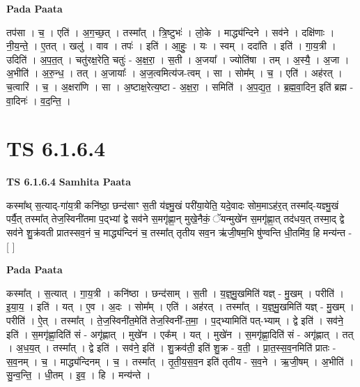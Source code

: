\documentclass[17pt]{extarticle}
\begin{document}
\textbf{Pada Paata} \newline

तप॑सा । च॒ । एति॑ । अ॒ग॒च्छ॒त् । तस्मा᳚त् । त्रि॒ष्टुभः॑ । लो॒के । माद्ध्य॑न्दिने । सव॑ने । दक्षि॑णाः । नी॒य॒न्ते॒ । ए॒तत् । खलु॑ । वाव । तपः॑ । इति॑ । आ॒हुः॒ । यः । स्वम् । ददा॑ति । इति॑ । गा॒य॒त्री । उदिति॑ । अ॒प॒त॒त् । चतु॑रक्ष॒रेति॒ चतुः॑ - अ॒क्ष॒रा॒ । स॒ती । अ॒जया᳚ । ज्योति॑षा । तम् । अ॒स्यै॒ । अ॒जा । अ॒भीति॑ । अ॒रु॒न्ध॒ । तत् । अ॒जायाः᳚ । अ॒ज॒त्वमित्य॑ज-त्वम् । सा । सोम᳚म् । च॒ । एति॑ । अह॑रत् । च॒त्वारि॑ । च॒ । अ॒क्षरा॑णि । सा । अ॒ष्टाक्ष॒रेत्य॒ष्टा - अ॒क्ष॒रा॒ । समिति॑ । अ॒प॒द्य॒त॒ । ब्र॒ह्म॒वा॒दिन॒ इति॑ ब्रह्म - वा॒दिनः॑ । व॒द॒न्ति॒ ।  \newline




\section*{ TS 6.1.6.4 }

\textbf{TS 6.1.6.4 } \newline
\textbf{Samhita Paata} \newline

कस्मा᳚थ् स॒त्याद्-गा॑य॒त्री कनि॑ष्ठा॒ छन्द॑साꣳ स॒ती य॑ज्ञ्मु॒खं परी॑या॒येति॒ यदे॒वादः सोम॒माऽह॑र॒त् तस्मा᳚द्-यज्ञ्मु॒खं पर्यै॒त् तस्मा᳚त् तेज॒स्विनी॑तमा प॒द्भ्यां द्वे सव॑ने स॒मगृ॑ह्णा॒न् मुखे॒नैकं॒ ॅयन्मुखे॑न स॒मगृ॑ह्णा॒त् तद॑धय॒त् तस्मा॒द् द्वे सव॑ने शु॒क्र॑वती प्रातस्सव॒नं च॒ माद्ध्य॑न्दिनं च॒ तस्मा᳚त् तृतीय सव॒न ऋ॑जी॒षम॒भि षु॑ण्वन्ति धी॒तमि॑व॒ हि मन्य॑न्त - [  ] \newline

\textbf{Pada Paata} \newline

कस्मा᳚त् । स॒त्यात् । गा॒य॒त्री । कनि॑ष्ठा । छन्द॑साम् । स॒ती । य॒ज्ञ्॒मु॒खमिति॑ यज्ञ् - मु॒खम् । परीति॑ । इ॒या॒य॒ । इति॑ । यत् । ए॒व । अ॒दः । सोम᳚म् । एति॑ । अह॑रत् । तस्मा᳚त् । य॒ज्ञ्॒मु॒खमिति॑ यज्ञ् - मु॒खम् । परीति॑ । ऐ॒त् । तस्मा᳚त् । ते॒ज॒स्विनी॑त॒मेति॑ तेज॒स्विनी᳚-त॒मा॒ । प॒द्भ्यामिति॑ पत्-भ्याम् । द्वे इति॑ । सव॑ने॒ इति॑ । स॒मगृ॑ह्णा॒दिति॑ सं - अगृ॑ह्णात् । मुखे॑न । एक᳚म् । यत् । मुखे॑न । स॒मगृ॑ह्णा॒दिति॑ सं - अगृ॑ह्णात् । तत् । अ॒ध॒य॒त् । तस्मा᳚त् । द्वे इति॑ । सव॑ने॒ इति॑ । शु॒क्रव॑ती॒ इति॑ शु॒क्र - व॒ती॒ । प्रा॒त॒स्स॒व॒नमिति॑ प्रातः - स॒व॒नम् । च॒ । माद्ध्य॑न्दिनम् । च॒ । तस्मा᳚त् । तृ॒ती॒य॒स॒व॒न इति॑ तृतीय - स॒व॒ने । ऋ॒जी॒षम् । अ॒भीति॑ । सु॒न्व॒न्ति॒ । धी॒तम् । इ॒व॒ । हि । मन्य॑न्ते ।  \newline
\end{document}

